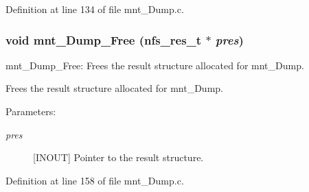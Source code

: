Definition at line 134 of file mnt\_\-Dump.c.
\subsubsection[{mnt\_\-Dump\_\-Free}]{\setlength{\rightskip}{0pt plus 5cm}void mnt\_\-Dump\_\-Free (nfs\_\-res\_\-t $\ast$ {\em pres})}\label{mnt__Dump_8c_d835adce5166476b3899d71b4da4dc18}


mnt\_\-Dump\_\-Free: Frees the result structure allocated for mnt\_\-Dump.

Frees the result structure allocated for mnt\_\-Dump.

\begin{Desc}
\item[Parameters:]
\begin{description}
\item[{\em pres}][INOUT] Pointer to the result structure. \end{description}
\end{Desc}


Definition at line 158 of file mnt\_\-Dump.c.